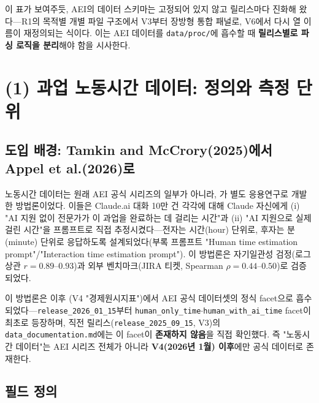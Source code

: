 \documentclass[11pt]{article}
\begin{document}
이 표가 보여주듯, AEI의 데이터 스키마는 고정되어 있지 않고 릴리스마다 진화해 왔다---R1의 목적별 개별 파일 구조에서 V3부터 장방형 통합 패널로, V6에서 다시 열 이름이 재정의되는 식이다. 이는 AEI 데이터를 \texttt{data/proc/}에 흡수할 때 \textbf{릴리스별로 파싱 로직을 분리}해야 함을 시사한다.

\section{(1) 과업 노동시간 데이터: 정의와 측정 단위}
\label{sec:time}

\subsection{도입 배경: Tamkin and McCrory(2025)에서 Appel et al.(2026)로}

노동시간 데이터는 원래 AEI 공식 시리즈의 일부가 아니라, \citet{tamkin-2025-estimating-ai-productivity-gains-from}가 별도 응용연구로 개발한 방법론이었다. 이들은 Claude.ai 대화 10만 건 각각에 대해 Claude 자신에게 (i) "AI 지원 없이 전문가가 이 과업을 완료하는 데 걸리는 시간"과 (ii) "AI 지원으로 실제 걸린 시간"을 프롬프트로 직접 추정시켰다---전자는 시간(hour) 단위로, 후자는 분(minute) 단위로 응답하도록 설계되었다(부록 프롬프트 "Human time estimation prompt"/"Interaction time estimation prompt"). 이 방법론은 자기일관성 검정(로그상관 $r=0.89$--$0.93$)과 외부 벤치마크(JIRA 티켓, Spearman $\rho=0.44$--$0.50$)로 검증되었다.

이 방법론은 이후 \citet{appel-2026-economic-primitives}(V4 "경제원시지표")에서 AEI 공식 데이터셋의 정식 facet으로 흡수되었다---\texttt{release\_2026\_01\_15}부터 \texttt{human\_only\_time}$\cdot$\texttt{human\_with\_ai\_time} facet이 최초로 등장하며, 직전 릴리스(\texttt{release\_2025\_09\_15}, V3)의 \texttt{data\_documentation.md}에는 이 facet이 \textbf{존재하지 않음}을 직접 확인했다. 즉 "노동시간 데이터"는 AEI 시리즈 전체가 아니라 \textbf{V4(2026년 1월) 이후}에만 공식 데이터로 존재한다.

\subsection{필드 정의}
\end{document}
